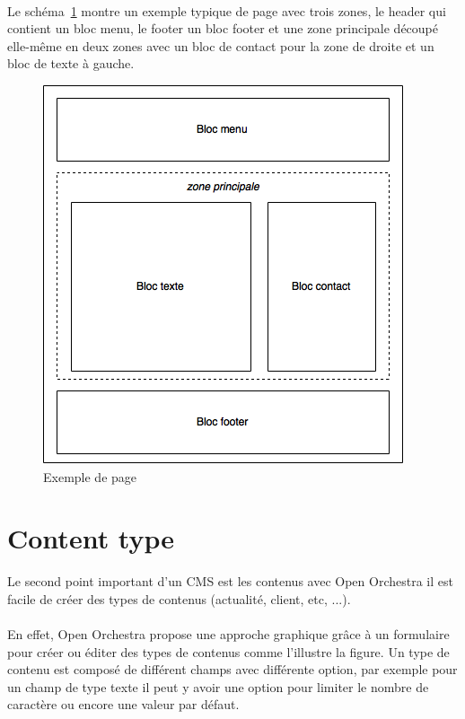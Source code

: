          \paragraph{}
		Le schéma~\ref{node} montre un exemple typique de page avec trois zones, le header qui contient un bloc menu, le footer un bloc footer et une zone principale découpé elle-même en deux zones avec un bloc de contact pour la zone de droite et un bloc de texte à gauche.
		\begin{figure}[H]
        \begin{center}
          \includegraphics[scale=0.75]{images/node}
        \end{center}
        \caption{Exemple de page}
        \label{node}
      \end{figure}
         \section{Content type}
         Le second point important d'un CMS est les contenus avec Open Orchestra il est facile de créer des types de contenus (actualité, client, etc, ...).
          \paragraph{}
          En effet, Open Orchestra propose une approche graphique grâce à un formulaire pour créer ou éditer des types de contenus comme l'illustre la figure.
          Un type de contenu est composé de différent champs avec différente option, par exemple pour un champ de type texte il peut y avoir une option pour limiter le nombre de caractère ou encore une valeur par défaut.
